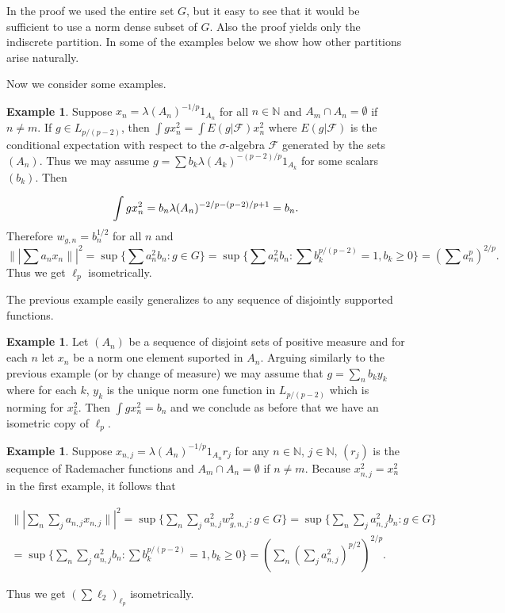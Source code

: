 \documentclass[12pt]{amsart}
\theoremstyle{definition}
\newtheorem{example}[theorem]{Example}
\theoremstyle{remark}
\numberwithin{equation}{section}
\begin{document}
In the proof we used the entire
set $G$, but it easy to see that it would be sufficient to use a norm
dense subset of $G$. Also the proof yields only the indiscrete partition.
In some of the examples below we show how other partitions arise naturally.

Now we consider some examples.

\begin{example}
Suppose $x_n=\lambda(A_n)^{-1/p}1_{A_n}$ for all $n \in \mathbb N$
and $A_m \cap A_n = \emptyset$ if $n \ne m$. If $g \in L_{p/(p-2)}$,
then $\int g x_n^2 =\int E(g|\mathcal F)x_n^2$
where $E(g|\mathcal F)$ is the conditional expectation with respect to the
$\sigma$-algebra $\mathcal F$
generated by the sets $(A_n)$. Thus we may assume $g =
\sum b_k \lambda(A_k)^{-(p-2)/p} 1_{A_k}$ for some scalars $(b_k)$. Then

$$\int g x_n^2 = b_n \lambda(A_n)^{-2/p-(p-2)/p+1}\\ =b_n .$$
 Therefore
$w_{g,n}= b_n^{1/2}$ for all $n$ and
$$\||\sum a_n x_n\||^2= \sup\{\sum
a_n^2 b_n :g \in G\}= \sup \{\sum a_n^2 b_n: \sum b_k^{p/(p-2)}=1,b_k
\ge 0\} = (\sum a_n^{p})^{2/p}.$$
Thus we get $\ell_p$ isometrically.
\end{example}

The previous example easily generalizes to any sequence of disjointly supported functions.

\begin{example}
Let $(A_n)$ be a sequence of disjoint sets of positive measure and for each $n$ let $x_n$ be a norm one element suported in $A_n$. Arguing similarly to the previous example (or by change of measure) we may assume that $g = \sum_n b_k y_k$ where  for each $k$, $y_k$ is the unique norm one function in $L_{p/(p-2)}$ which is norming for $x_k^2.$ Then
$\int g x_n^2 = b_n$ and we conclude as before that we have an isometric copy of $\ell_p.$
\end{example}

\begin{example} Suppose $x_{n,j}=\lambda(A_n)^{-1/p}1_{A_n}r_j$ for any $n
\in \mathbb N$, $j \in \mathbb N$, $(r_j)$ is the sequence of Rademacher
functions and $A_m \cap A_n = \emptyset$ if $n \ne m$. Because $x_{n,j}^2
=x_n^2$ in the first example, it follows that

\begin{multline*}
\||\sum_n\sum_j a_{n,j} x_{n,j}\||^2=\sup \{\sum_n \sum_j a_{n,j}^2
w_{g,n,j}^2 :g\in G\}= \sup\{\sum_n \sum_j a_{n,j}^2 b_n :g \in G\}\\
= \sup \{\sum_n \sum_j a_{n,j}^2 b_n: \sum b_k^{p/(p-2)}=1,b_k \ge 0\} =
(\sum_n(\sum_j a_{n,j}^2)^{p/2})^{2/p}.  \end{multline*}

Thus we get $(\sum \ell_2)_{\ell_p}$ isometrically.
\end{example}
\end{document}
